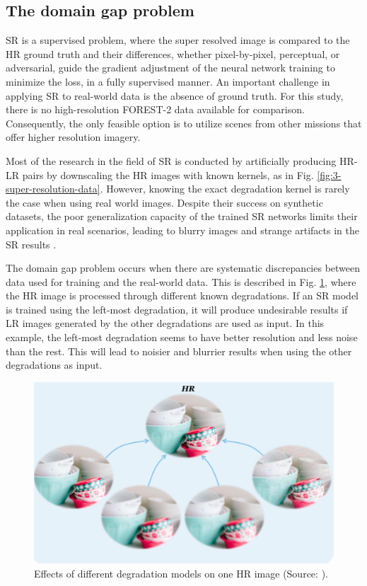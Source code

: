     \subsection{The domain gap problem} \label{subsec:domaingap}
 
        SR is a supervised problem, where the super resolved image is compared to the HR ground truth and their differences, whether pixel-by-pixel, perceptual, or adversarial, guide the gradient adjustment of the neural network training to minimize the loss, in a fully supervised manner. 
        An important challenge in applying SR to real-world data is the absence of ground truth. For this study, there is no high-resolution FOREST-2 data available for comparison. Consequently, the only feasible option is to utilize scenes from other missions that offer higher resolution imagery.

        Most of the research in the field of SR is conducted by artificially producing HR-LR pairs by downscaling the HR images with known kernels, as in Fig. \ref{fig:3-super-resolution-data}.
        However, knowing the exact degradation kernel is rarely the case when using real world images.
        Despite their success on synthetic datasets, the poor generalization capacity of the trained SR networks limits their application in real scenarios, leading to blurry images and strange artifacts in the SR results \cite{lugmayr2020ntire}.

        The domain gap problem occurs when there are systematic discrepancies between data used for training and the real-world data. 
        This is described in Fig. \ref{fig:2-domain-gap}, where the HR image is processed through different known degradations. 
        If an SR model is trained using the left-most degradation, it will produce undesirable results if LR images generated by the other degradations are used as input.
        In this example, the left-most degradation seems to have better resolution and less noise than the rest. This will lead to noisier and blurrier results when using the other degradations as input.

        \begin{figure}[H]
            \centering
            \includegraphics[scale=0.4]{Includes/2-domain-gap.pdf}
            \caption{Effects of different degradation models on one HR image (Source: \cite{liu2021blind}).}
            \label{fig:2-domain-gap}
        \end{figure}

